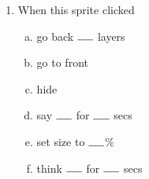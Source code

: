 \documentclass[11pt]{article}
\begin{document}
\noindent\makebox[\linewidth]{\rule{\paperwidth}{0.4pt}}
\begin{enumerate}
\item When this sprite clicked
\begin{enumerate}[a.]
\item go back $\rule{0.5cm}{0.15mm}$ layers
\item go to front
\item hide
\item say $\rule{0.5cm}{0.15mm}$ for $\rule{0.5cm}{0.15mm}$ secs
\item set size to $\rule{0.5cm}{0.15mm}$\%
\item think $\rule{0.5cm}{0.15mm}$ for $\rule{0.5cm}{0.15mm}$ secs
\end{enumerate}
\end{enumerate}
\end{document}
